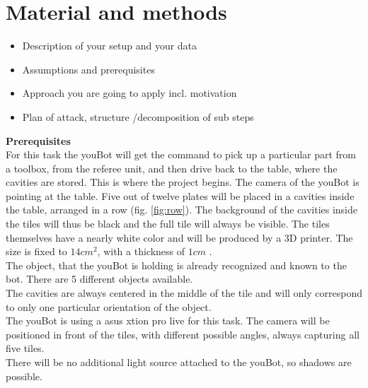 \documentclass{article}
\begin{document}
\section{Material and methods}

\begin{itemize}
\item Description of your setup and your data
\item Assumptions and prerequisites
\item Approach you are going to apply incl. motivation
\item Plan of attack, structure /decomposition of sub steps
\end{itemize}

\textbf{Prerequisites}\\

For this task the youBot will get the command to pick up a particular part from a toolbox, from the referee unit, and then drive back to the table, where the cavities are stored. This is where the project begins. The camera of the youBot is pointing at the table. Five out of twelve plates will be placed in a cavities inside the table, arranged in a row (fig. \ref{fig:row}). The background of the cavities inside the tiles will thus be black and the full tile will always be visible. The tiles themselves have a nearly white color and will be produced by a 3D printer. The size is fixed to $14cm^2$, with a thickness of  $1cm$ .\\
The object, that the youBot is holding is already recognized and known to the bot. There are 5 different objects available.\\
The cavities are always centered in the middle of the tile and will only correspond to only one particular orientation of the object.\\
The youBot is using a asus xtion pro live for this task. The camera will be positioned in front of the tiles, with different possible angles, always capturing all five tiles. \\
There will be no additional light source attached to the youBot, so shadows are possible.\\
\end{document}
